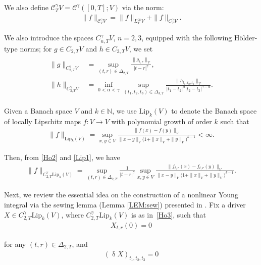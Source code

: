 \documentclass[letterpaper, 11pt,  reqno]{amsart}
\newcommand{\1}{\hspace{0.5mm}\text{I}\hspace{0.5mm}}
\newcommand{\noi}{\noindent}
\newcommand{\CC}{\mathcal{C}}
\newcommand{\al}{\alpha}
\newcommand{\updl}{\updelta}
\newcommand{\Dl}{\Delta}
\newcommand{\g}{\gamma}
\newcommand{\N}{\mathbb{N}}
\newcommand{\Lip}{\mathrm{Lip}}
\numberwithin{equation}{section}
\numberwithin{theorem}{section}
\begin{document}
\noi
We also define 
 $\CC^\g_T V = \CC^\g([0, T]; V)$ via the norm:
\begin{align}
\| f \|_{\CC^\g_TV} = \| f \|_{L^\infty_TV} + \|f\|_{C^\g_T V}.
\label{Ho1}
\end{align}


\noi 
We also introduce the spaces 
$C^\g_{n,T}V$, $n=2,3$, 
equipped with the following H\"older-type norms;
 for $g\in C_{2,T}V$ and $h\in C_{3,T}V$, we set
\begin{align}
\begin{split}
\| g\|_{C^\g_{2,T} V} & 
= \sup_{(t,r) \in \Dl_{2,T}} \frac{\|g_{t,r} \|_{V} }{|t-r|^{\g}}, \\
\| h\|_{C^\g_{3,T} V} & 
= \inf_{0<\al<\g} 
\sup_{(t_1,t_2,t_3) \in \Dl_{3,T}} 
\frac{ \|h_{t_1,t_2,t_3}\|_V}
{|t_1-t_2|^{\al} |t_2-t_3|^{\g-\al}}.
\end{split}
\label{Ho2}
\end{align}



\noi
Given a Banach space $V$ and $k \in \N$, 
we  use $\Lip_k(V)$ 
to denote the Banach space of 
locally Lipschitz maps $f:V\to V$
with polynomial growth of order $k$
such that 
\begin{align}
\|f\|_{\Lip_k(V)} = 
\sup_{x,y\in V} 
\frac{\|f(x)-f(y)\|_V}{\|x-y\|_V \big(1+\|x\|_V+\|y\|_V\big)^{k-1}}
<\infty .
\label{Lip1}
\end{align}



\noi
Then, 
from \eqref{Ho2} and \eqref{Lip1}, we have 
\begin{align}
\|f \|_{C^\g_{2, T}\Lip_k(V)}
= \sup_{(t,r) \in \Dl_{2,T}}
\frac 1{|t-r|^{\g}}
\sup_{x,y\in V} 
\frac{\| f_{t, r}(x)- f_{t, r}(y)\|_V}{\|x-y\|_V \big(1+\|x\|_V+\|y\|_V\big)^{k-1}}.
\label{Ho3}
\end{align}



\medskip
 
 Next, we 
review the essential idea
 on the construction of a nonlinear Young integral 
 via the sewing lemma (Lemma \ref{LEM:sew}) presented in \cite{CGLLO1}.
Fix a driver  $X\in C^\g_{2,T}\Lip_k(V)$, where $C^\g_{2,T}\Lip_k(V)$
is as in~\eqref{Ho3},  such that 
\begin{align*}
X_{t,r}(0)=0
\end{align*} 

\noi
for any $(t,r) \in  \Dl_{2,T}$, 
and 
\begin{align}
\label{Ja1}
(\updl X)_{t_1,t_2,t_3} = 0
\end{align}
\end{document}
